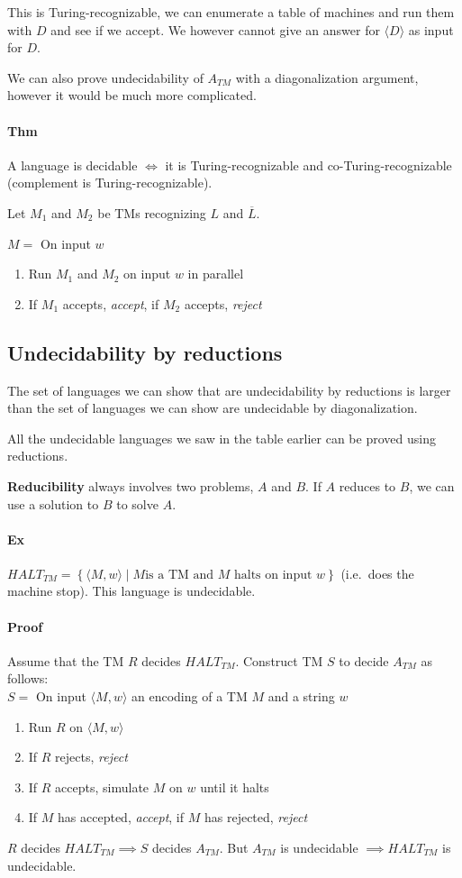 \documentclass[12 pt]{article}
\begin{document}
This is Turing-recognizable, we can enumerate a table of machines and
run them with $D$ and see if we accept. We however cannot give an
answer for $\langle D \rangle$ as input for $D$.

We can also prove undecidability of $A_{TM}$ with a diagonalization
argument, however it would be much more complicated.
\paragraph{Thm}
A language is decidable $\iff$ it is Turing-recognizable and
co-Turing-recognizable (complement is Turing-recognizable).

Let $M_1$ and $M_2$ be TMs recognizing $L$ and $\overline{L}$.

$M = $ On input $w$
\begin{enumerate}
\item Run $M_1$ and $M_2$ on input $w$ in parallel
\item If $M_1$ accepts, \textit{accept}, if $M_2$ accepts, \textit{reject}
\end{enumerate}
\subsection{Undecidability by reductions}
The set of languages we can show that are undecidability by reductions
is larger than the set of languages we can show are undecidable by
diagonalization.

All the undecidable languages we saw in the table earlier can be
proved using reductions.

\textbf{Reducibility} always involves two problems, $A$ and $B$. If
$A$ reduces to $B$, we can use a solution to $B$ to solve $A$.
\paragraph{Ex} $HALT_{TM} = \left\{\langle M,w \rangle \mid M \text{
    is a TM and } M \text{ halts on input }w\right\}$ (i.e.\ does the
machine stop). This language is undecidable.
\paragraph{Proof} Assume that the TM $R$ decides
$HALT_{TM}$. Construct TM $S$ to decide $A_{TM}$ as follows:
\\ $S = $ On input $\langle M,w \rangle$ an encoding of a TM $M$ and a
string $w$
\begin{enumerate}
\item Run $R$ on $\langle M,w \rangle$
\item If $R$ rejects, \textit{reject}
\item If $R$ accepts, simulate $M$ on $w$ until it halts
\item If $M$ has accepted, \textit{accept}, if $M$ has rejected, \textit{reject}
\end{enumerate}
$R$ decides $HALT_{TM} \implies S$ decides $A_{TM}$. But $A_{TM}$ is
undecidable $\implies HALT_{TM}$ is undecidable.
\end{document}
